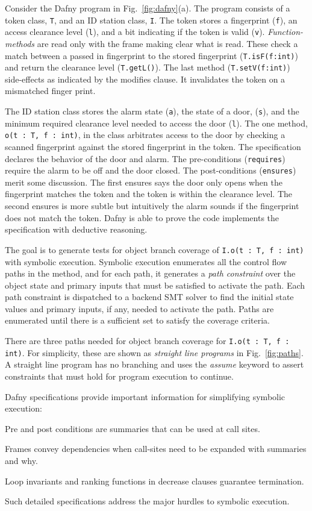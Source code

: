 \documentclass[11pt,onecolumn,notitlepage]{article}
\newcommand{\figref}[1]{Fig.~\ref{#1}}
\begin{document}
Consider the Dafny program in \figref{fig:dafny}(a). The program consists of a token class, \texttt{T}, and an ID station class, \texttt{I}. The token stores a fingerprint (\texttt{f}), an access clearance level (\texttt{l}), and a bit indicating if the token is valid (\texttt{v}). \emph{Function-methods} are read only with the frame making clear what is read. These check a match between a passed in fingerprint to the stored fingerprint (\texttt{T.isF(f:int)}) and return the clearance level (\texttt{T.getL()}). The last method (\texttt{T.setV(f:int)}) side-effects as indicated by the modifies clause. It invalidates the token on a mismatched finger print.

The ID station class stores the alarm state (\texttt{a}), the state of a door, (\texttt{s}), and the minimum required clearance level needed to access the door (\texttt{l}). The one method, \texttt{o(t : T, f : int)}, in the class arbitrates access to the door by checking a scanned fingerprint against the stored fingerprint in the token. The specification declares the behavior of the door and alarm. The pre-conditions (\texttt{requires}) require the alarm to be off and the door closed. The post-conditions (\texttt{ensures}) merit some discussion. The first ensures says the door only opens when the fingerprint matches the token and the token is within the clearance level. The second ensures is more subtle but intuitively the alarm sounds if the fingerprint does not match the token. Dafny is able to prove the code implements the specification with deductive reasoning.

The goal is to generate tests for object branch coverage of \texttt{I.o(t : T, f : int)} with symbolic execution. Symbolic execution enumerates all the control flow paths in the method, and for each path, it generates a \emph{path constraint} over the object state and primary inputs that must be satisfied to activate the path. Each path constraint is dispatched to a backend SMT solver to find the initial state values and primary inputs, if any, needed to activate the path. Paths are enumerated until there is a sufficient set to satisfy the coverage criteria.

There are three paths needed for object branch coverage for \texttt{I.o(t : T, f : int)}. For simplicity, these are shown as \emph{straight line programs} in \figref{fig:paths}. A straight line program has no branching and uses the \emph{assume} keyword to assert constraints that must hold for program execution to continue. 

Dafny specifications provide important information for simplifying symbolic execution:
\begin{compactitem}
  \item Pre and post conditions are summaries that can be used at call sites.
  \item Frames convey dependencies when call-sites need to be expanded with summaries and why.
  \item Loop invariants and ranking functions in decrease clauses guarantee termination.
\end{compactitem}
Such detailed specifications address the major hurdles to symbolic execution.
\end{document}
